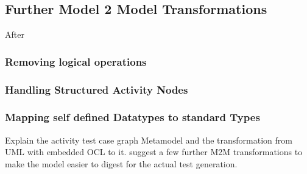 

\subsection{Further Model 2 Model Transformations}
After 

\subsubsection{Removing logical operations}

\subsubsection{Handling Structured Activity Nodes}
\subsubsection{Mapping self defined Datatypes to standard Types}
Explain the activity test case graph Metamodel and the transformation from UML with embedded OCL to it. 
suggest a few further M2M transformations to make the model easier to digest for the actual test generation.
